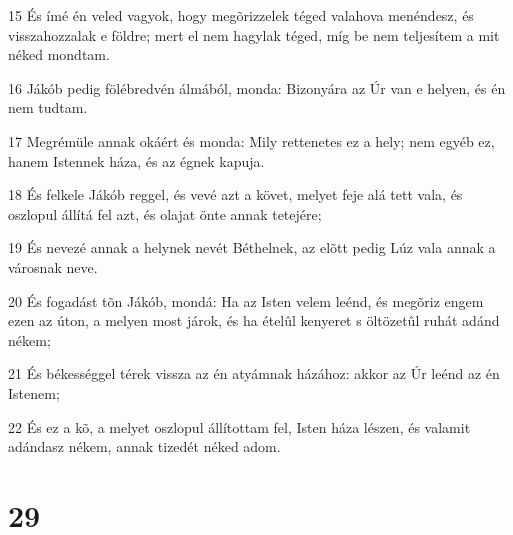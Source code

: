 \par 15 És ímé én veled vagyok, hogy megõrizzelek téged valahova menéndesz, és visszahozzalak e földre; mert el nem hagylak téged, míg be nem teljesítem a mit néked mondtam.
\par 16 Jákób pedig fölébredvén álmából, monda: Bizonyára az Úr van e helyen, és én nem tudtam.
\par 17 Megrémüle annak okáért és monda: Mily rettenetes ez a hely; nem egyéb ez, hanem Istennek háza, és az égnek kapuja.
\par 18 És felkele Jákób reggel, és vevé azt a követ, melyet feje alá tett vala, és oszlopul állítá fel azt, és  olajat önte annak tetejére;
\par 19 És nevezé annak a helynek nevét Béthelnek, az elõtt pedig Lúz vala annak a városnak neve.
\par 20 És fogadást tõn Jákób, mondá: Ha az Isten velem leénd, és megõriz engem ezen az úton, a melyen most járok, és ha ételûl kenyeret s öltözetûl ruhát adánd nékem;
\par 21 És békességgel térek vissza az én atyámnak házához: akkor az Úr leénd az én Istenem;
\par 22 És ez a kõ, a melyet oszlopul állítottam fel, Isten háza lészen, és valamit adándasz nékem, annak tizedét néked adom.

\chapter{29}

